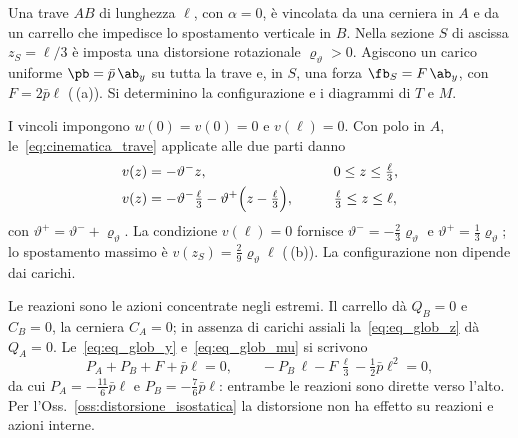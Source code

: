 \begin{esempio}\label{sec:esempio_completo}
	Una trave $AB$ di lunghezza $\ell$, con $\alpha = 0$,
	è vincolata da una cerniera in $A$ e da un carrello
	che impedisce lo spostamento verticale in $B$. Nella
	sezione $S$ di ascissa $z_S = \ell/3$ è imposta una
	distorsione rotazionale $\varrho_\vartheta > 0$.
	Agiscono un carico uniforme $\pb = \bar p\,\ab_y$
	su tutta la trave e, in $S$, una forza
	$\fb_S = F\,\ab_y$, con $F = 2\bar p\ell$
	(\,(a)). Si determinino
	la configurazione e i diagrammi di $T$ e $M$.
	
	\begin{svolgimento}
		
		I vincoli impongono $w(0) = v(0) = 0$ e
		$v(\ell) = 0$. Con polo in $A$,
		le~\eqref{eq:cinematica_trave} applicate alle
		due parti danno
		\begin{alignat*}{2}
			v(z) &= -\vartheta^- z,
			&\qquad& 0 \le z \le \tfrac{\ell}{3},\\
			v(z) &= -\vartheta^-\tfrac{\ell}{3}
			- \vartheta^+\Bigl(z - \tfrac{\ell}{3}\Bigr),
			&& \tfrac{\ell}{3} \le z \le \ell,
		\end{alignat*}
		con $\vartheta^+ = \vartheta^- + \varrho_\vartheta$.
		La condizione $v(\ell) = 0$ fornisce
		$\vartheta^- = -\tfrac{2}{3}\varrho_\vartheta$ e
		$\vartheta^+ = \tfrac{1}{3}\varrho_\vartheta$;
		lo spostamento massimo è
		$v(z_S) = \tfrac{2}{9}\varrho_\vartheta\ell$
		(\,(b)).
		La configurazione non dipende dai carichi.
		
		Le reazioni sono le azioni concentrate negli
		estremi. Il carrello dà $Q_B = 0$ e $C_B = 0$, la
		cerniera $C_A = 0$; in assenza di carichi assiali
		la~\eqref{eq:eq_glob_z} dà $Q_A = 0$.
		Le~\eqref{eq:eq_glob_y} e~\eqref{eq:eq_glob_mu}
		si scrivono
		\begin{equation*}
			P_A + P_B + F + \bar p\ell = 0, \qquad
			-P_B\,\ell - F\,\tfrac{\ell}{3} - \tfrac{1}{2}\bar p\ell^2 = 0,
		\end{equation*}
		da cui $P_A = -\tfrac{11}{6}\bar p\ell$ e
		$P_B = -\tfrac{7}{6}\bar p\ell$: entrambe le
		reazioni sono dirette verso l'alto. Per
		l'Oss.~\ref{oss:distorsione_isostatica} la
		distorsione non ha effetto su reazioni e azioni
		interne.
		



\end{svolgimento}
\end{esempio}
